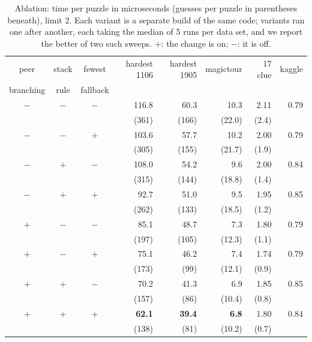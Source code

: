 \documentclass[11pt]{article}
\theoremstyle{definition}
\theoremstyle{plain}
\begin{document}
\begin{table}[t]
\centering
\caption{Ablation: time per puzzle in microseconds (guesses per puzzle in parentheses beneath), limit 2. Each variant is a separate
build of the same code; variants ran one after another, each taking the median of 5 runs per data set, and we report
the better of two such sweeps. $+$: the change is on; $-$: it is off.}
\label{tab:ablation}
\small
\begin{tabular}{cccrrrrr}
\toprule
peer & stack & fewest & hardest 1106 & hardest 1905 & magictour & 17 clue & kaggle \\
branching & rule & fallback & & & & & \\
\midrule
$-$ & $-$ & $-$ & 116.8 & 60.3 & 10.3 & 2.11 & 0.79 \\
&&& (361) & (166) & (22.0) & (2.4) & \\[2pt]
$-$ & $-$ & $+$ & 103.6 & 57.7 & 10.2 & 2.00 & 0.79 \\
&&& (305) & (155) & (21.7) & (1.9) & \\[2pt]
$-$ & $+$ & $-$ & 108.0 & 54.2 & 9.6 & 2.00 & 0.84 \\
&&& (315) & (144) & (18.8) & (1.4) & \\[2pt]
$-$ & $+$ & $+$ & 92.7 & 51.0 & 9.5 & 1.95 & 0.85 \\
&&& (262) & (133) & (18.5) & (1.2) & \\[2pt]
$+$ & $-$ & $-$ & 85.1 & 48.7 & 7.3 & 1.80 & 0.79 \\
&&& (197) & (105) & (12.3) & (1.1) & \\[2pt]
$+$ & $-$ & $+$ & 75.1 & 46.2 & 7.4 & 1.74 & 0.79 \\
&&& (173) & (99) & (12.1) & (0.9) & \\[2pt]
$+$ & $+$ & $-$ & 70.2 & 41.3 & 6.9 & 1.85 & 0.85 \\
&&& (157) & (86) & (10.4) & (0.8) & \\[2pt]
$+$ & $+$ & $+$ & \textbf{62.1} & \textbf{39.4} & \textbf{6.8} & 1.80 & 0.84 \\
&&& (138) & (81) & (10.2) & (0.7) & \\[2pt]
\bottomrule
\end{tabular}
\end{table}
\end{document}
